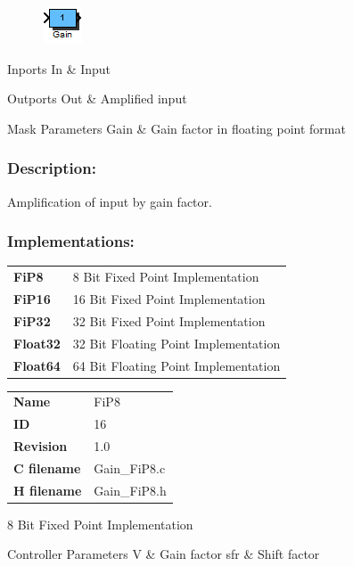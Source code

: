 \label{block:Gain}
\begin{figure}[H]\includegraphics{Gain}\end{figure} 

\begin{XtoCtabular}{Inports}
In & Input\tabularnewline
\hline
\end{XtoCtabular}


\begin{XtoCtabular}{Outports}
Out & Amplified input\tabularnewline
\hline
\end{XtoCtabular}

\begin{XtoCtabular}{Mask Parameters}
Gain & Gain factor in floating point format\tabularnewline
\hline
\end{XtoCtabular}

\subsubsection*{Description:}
Amplification of input by gain factor.

\subsubsection*{Implementations:}
\begin{tabular}{l l}
\textbf{FiP8} & 8 Bit Fixed Point Implementation\tabularnewline
\textbf{FiP16} & 16 Bit Fixed Point Implementation\tabularnewline
\textbf{FiP32} & 32 Bit Fixed Point Implementation\tabularnewline
\textbf{Float32} & 32 Bit Floating Point Implementation\tabularnewline
\textbf{Float64} & 64 Bit Floating Point Implementation\tabularnewline
\end{tabular}

\nopagebreak[0]
\begin{tabular}{l l}
\textbf{Name} & FiP8 \tabularnewline
\textbf{ID} & 16 \tabularnewline
\textbf{Revision} & 1.0 \tabularnewline
\textbf{C filename} & Gain\_FiP8.c \tabularnewline
\textbf{H filename} & Gain\_FiP8.h \tabularnewline
\end{tabular}
\vspace{1ex}

8 Bit Fixed Point Implementation

\begin{XtoCtabular}{Controller Parameters}
V & Gain factor\tabularnewline
\hline
sfr & Shift factor\tabularnewline
\hline
\end{XtoCtabular}

